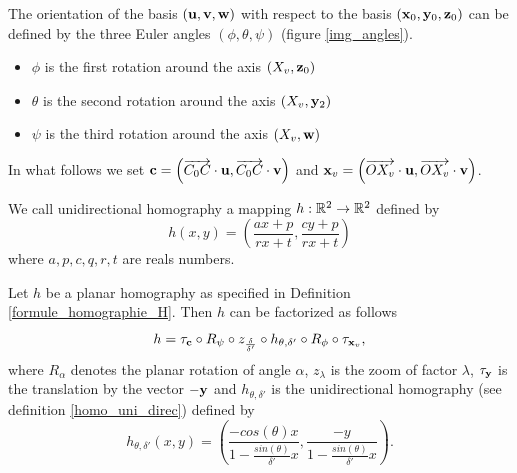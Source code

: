 The orientation of the basis $(\mathbf{u},\mathbf{v},\mathbf{w})$ with respect to the basis $(\mathbf{x}_0,\mathbf{y}_0,\mathbf{z}_0)$ can be defined by the three Euler angles $(\phi , \theta ,\psi )$ (figure \ref{img_angles}).
\begin{itemize}
\item $\phi$ is the first rotation around the axis $(X_v ,\mathbf{z}_0)$
\item $\theta$ is the second rotation around the axis $(X_v , \mathbf{y}_2 )$
\item $\psi$ is the third rotation around the axis $(X_v , \mathbf{w} )$
\end{itemize}

In what follows we set $\mathbf{c}= \left (\overrightarrow{C_0 C}\cdot \mathbf{u} , \overrightarrow{C_0 C}\cdot \mathbf{v} \right)$ and $\mathbf{x}_v=\left( \overrightarrow{O X_v}\cdot \mathbf{u} , \overrightarrow{O X_v}\cdot \mathbf{v} \right )$.\\

 \begin{Def}
We call unidirectional homography a mapping $h:\mathbb{R}^{2} \rightarrow \mathbb{R}^{2}$ defined by
\begin{equation*}
h(x,y)=\left ( \frac{ax+p}{rx+t} , \frac{cy+p}{rx+t} \right)
\end{equation*}
where $a,p,c,q,r,t$ are reals numbers.
\label{homo_uni_direc}
\end{Def}

\begin{prop}
Let $h$ be a planar homography as specified in Definition \ref{formule_homographie_H}. Then $h$ can be factorized as follows
\begin{equation}
h = \tau_{\mathbf{c}}   \circ R_{\psi} \circ z_{\frac{\delta}{\delta'}} \circ h_{\theta,\delta'} \circ R_{\phi} \circ \tau_{\mathbf{x}_v},
\label{formul_decomp}
\end{equation}
where $R_\alpha$ denotes the planar rotation of angle $\alpha$, $z_\lambda$ is the zoom of factor $\lambda$, $\tau_{\mathbf{y}}$ is the translation by the vector $-\mathbf{y}$ and $h_{\theta,\delta'}$ is the unidirectional homography (see definition \ref{homo_uni_direc}) defined by
\begin{equation}
h_{\theta,\delta'}(x,y)=\left(\frac{-cos(\theta)x}{1-\frac{sin(\theta)}{\delta'}x} ,\frac{-y}{1-\frac{sin(\theta)}{\delta'}x}\right).
\label{mise_perspective}
\end{equation}
\label{prop_decomp}
\end{prop}


